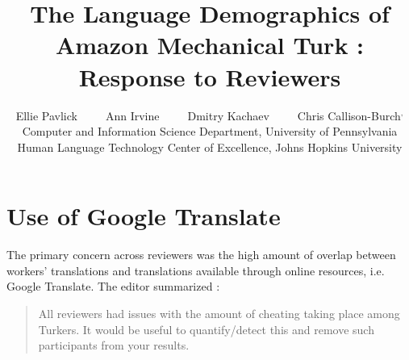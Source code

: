 \documentclass[11pt]{article}
\title{The Language Demographics of  Amazon Mechanical Turk : Response  to Reviewers}
\author{Ellie Pavlick\affliationPenn \ \ \ \ \ Ann Irvine\affliationJHU  \ \ \ \ \ Dmitry Kachaev\affliationJHU  \ \ \ \ \  Chris Callison-Burch\affliationPenn$^{,}$\affliationJHU \\
\affliationPenn Computer and Information Science Department, University of Pennsylvania \\
\affliationJHU Human Language Technology Center of Excellence, Johns Hopkins University \\
  }
\author{}
\date{}
\begin{document}
\maketitle


\section{Use of Google Translate}



The primary concern across reviewers was the high amount of overlap between workers' translations and translations available through online resources, i.e. Google Translate. The editor summarized : 
\begin{quote}
All reviewers had issues with the amount of cheating taking place among Turkers. It would be useful to quantify/detect this and remove such participants from your results.
\end{quote}
\end{document}
